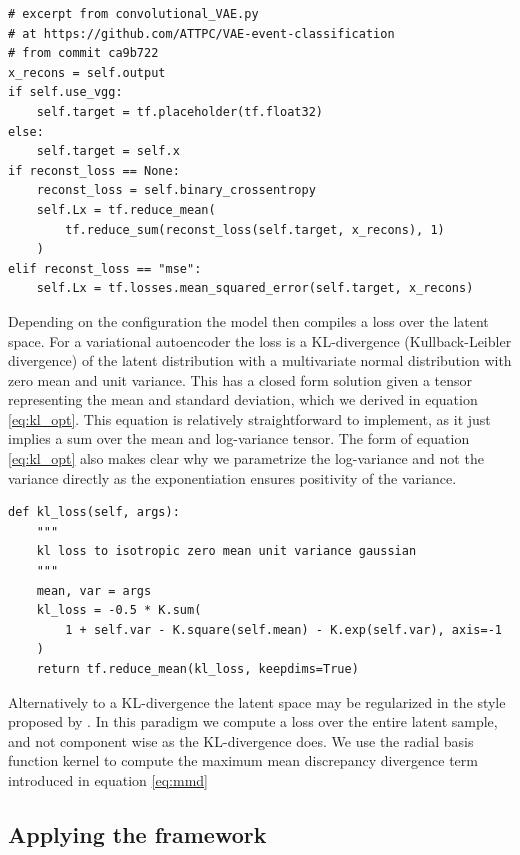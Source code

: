 \begin{minipage}{\linewidth}
\begin{lstlisting}[language=iPython]
# excerpt from convolutional_VAE.py
# at https://github.com/ATTPC/VAE-event-classification
# from commit ca9b722
x_recons = self.output
if self.use_vgg:
    self.target = tf.placeholder(tf.float32)
else:
    self.target = self.x
if reconst_loss == None:
    reconst_loss = self.binary_crossentropy
    self.Lx = tf.reduce_mean(
        tf.reduce_sum(reconst_loss(self.target, x_recons), 1)
    )
elif reconst_loss == "mse":
    self.Lx = tf.losses.mean_squared_error(self.target, x_recons)
\end{lstlisting}
\end{minipage}


Depending on the configuration the model then compiles a loss over the latent space. For a variational autoencoder the loss is a  KL-divergence (Kullback-Leibler divergence) of the latent distribution with a multivariate normal distribution with zero mean and unit variance. This has a closed form solution given a tensor representing the mean and standard deviation, which we derived in equation \ref{eq:kl_opt}. This equation is relatively straightforward to implement, as it just implies a sum over the mean and log-variance tensor. The form of equation \ref{eq:kl_opt} also makes clear why we parametrize the log-variance and not the variance directly as the exponentiation ensures positivity of the variance.


\begin{minipage}{\linewidth}
\begin{lstlisting}[language=iPython]
def kl_loss(self, args):
    """
    kl loss to isotropic zero mean unit variance gaussian
    """
    mean, var = args
    kl_loss = -0.5 * K.sum(
        1 + self.var - K.square(self.mean) - K.exp(self.var), axis=-1
    )
    return tf.reduce_mean(kl_loss, keepdims=True)
\end{lstlisting}
\end{minipage}

Alternatively to a KL-divergence the latent space may be regularized in the style proposed by \citet{Zhao}. In this paradigm we compute a loss over the entire latent sample, and not component wise as the KL-divergence does. We use the radial basis function kernel to compute the maximum mean discrepancy divergence term introduced in equation \ref{eq:mmd} 

\subsection{Applying the framework}

